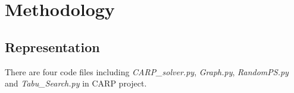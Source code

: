 \documentclass[conference,compsoc]{IEEEtran}
\begin{document}



\section{Methodology}

\subsection{Representation}
There are four code files including \textit{CARP\_solver.py},  \textit{Graph.py}, \textit{RandomPS.py} and \textit{Tabu\_Search.py} in CARP project. 
\end{document}

